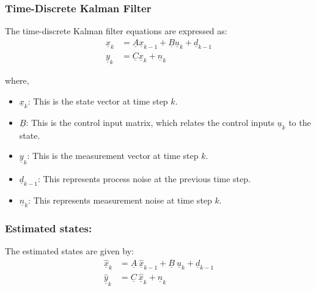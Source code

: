 \subsubsection{Time-Discrete Kalman Filter}
The time-discrete Kalman filter equations are expressed as:
$$
\begin{aligned}
	\underline{x}_{k} &= \underline{A} \underline{x}_{k-1} + \underline{B} \underline{u}_{k} + \underline{d}_{k-1} \\
	\underline{y}_{k} &= \underline{C} \underline{x}_{k} + \underline{n}_{k}
\end{aligned}
$$

where, 
\begin{itemize}
	\item $\underline{x}_k$: This is the state vector at time step $k$.
	\item $\underline{B}$: This is the control input matrix, which relates the control inputs $\underline{u}_k$ to the state.
	\item $\underline{y}_k$: This is the measurement vector at time step $k$.
	\item $\underline{d}_{k-1}$: This represents process noise at the previous time step.
	\item $\underline{n}_k$: This represents measurement noise at time step $k$.
\end{itemize}

\subsubsection{Estimated states:}
The estimated states are given by:
$$
\begin{aligned}
	\underline{\hat{x}}_{k} &= \underline{A} \  \underline{\hat{x}}_{k-1} + \underline{B} \ \underline{u}_{k} + \underline{d}_{k-1} \\
	\underline{\hat{y}}_{k} &= \underline{C} \ \underline{\hat{x}}_{k} + \underline{n}_{k}
\end{aligned}
$$
